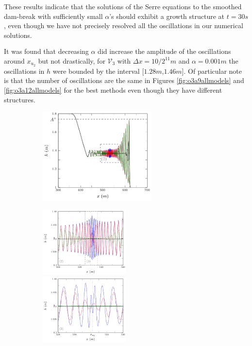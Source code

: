 \documentclass[times]{elsarticle}
\begin{document}
These results indicate that the solutions of the Serre equations to the smoothed dam-break with sufficiently small $\alpha$'s should exhibit a growth structure at $t=30s$, even though we have not precisely resolved all the oscillations in our numerical solutions. 

It was found that decreasing $\alpha$ did increase the amplitude of the oscillations around $x_{u_2}$ but not drastically, for $\mathcal{V}_3$ with $\Delta x= 10/2^{11}m$ and $\alpha = 0.001m$ the oscillations in $h$ were bounded by the interval [$1.28m$,$1.46m$]. Of particular note is that the number of oscillations are the same in Figures \ref{fig:o3a9allmodels} and \ref{fig:o3a12allmodels} for the best methods even though they have different structures.

\begin{figure}
\centering
\begin{subfigure}{\textwidth}
	\centering
	\includegraphics[width=0.65\textwidth]{pics/results/SDB/numsols/alpha10/1-figure0.pdf}
\end{subfigure}
\begin{subfigure}{\textwidth}
	\includegraphics[width=0.5\textwidth]{pics/results/SDB/numsols/alpha10/2-figure0.pdf}
	\includegraphics[width=0.5\textwidth]{pics/results/SDB/numsols/alpha10/3-figure0.pdf}

\end{subfigure}
\end{figure}
\end{document}
